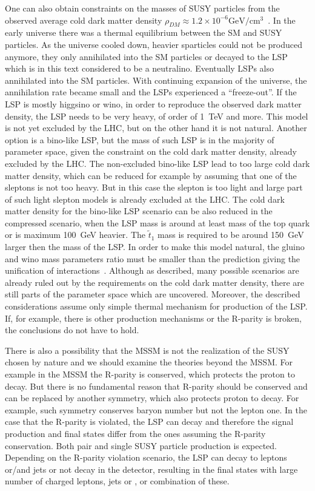 One can also obtain constraints on the masses of SUSY particles from the observed average cold dark matter density $\rho_{DM} \approx 1.2 \times 10^{-6} \mathrm{GeV/cm^{3}}$~\cite{Ade:2015xua, Patrignani:2016xqp}.  In the early universe there was a thermal equilibrium between the SM and SUSY particles. As the universe cooled down, heavier sparticles could not be produced anymore, they only annihilated into the SM particles or decayed to the LSP which is in this text considered to be a neutralino. Eventually LSPs also annihilated into the SM particles. With continuing expansion of the universe, the annihilation rate became small and the LSPs experienced a ``freeze-out''. If the LSP is mostly higgsino or wino, in order to reproduce the observed dark matter density, the LSP needs to be very heavy, of order of 1~TeV and more. This model is not yet excluded by the LHC, but on the other hand it is not natural. Another option is a bino-like LSP, but the mass of such LSP is in the majority of parameter space, given the constraint on the cold dark matter density,  already excluded by the LHC. The non-excluded bino-like LSP lead to too large cold dark matter density, which can be reduced for example by assuming that one of the sleptons is not too heavy.  But in this case the slepton is too light and large part of such light slepton models is already excluded at the LHC. The cold dark matter density for the bino-like LSP scenario can be also reduced in the compressed scenario, when the LSP mass is around at least mass of the top quark or is maximum 100~GeV heavier. The $\tilde{t}_{1}$ mass is required to be around 150~GeV larger then the mass of the LSP. In order to make this  model natural, the gluino and wino mass parameters ratio must be smaller than the prediction giving the unification of interactions~\cite{Martin:2008aw}. Although as described, many possible scenarios are already ruled out by the requirements on the cold dark matter density, there are still parts of the parameter space which are uncovered. Moreover, the described considerations assume only simple thermal mechanism for production of the LSP. If, for example, there is other production mechanisms or the R-parity is broken, the conclusions do not have to hold.

There is also a possibility that the MSSM is not the realization of the SUSY chosen by nature and we should examine the theories beyond the MSSM. For example in the MSSM the R-parity is conserved, which protects the proton to decay. But there is no fundamental reason that R-parity should be conserved and can be replaced by another symmetry, which also protects proton to decay. For example, such symmetry conserves baryon number but not the lepton one. In the case that the R-parity is violated, the LSP can decay and therefore the signal production and final states differ from the ones assuming the R-parity conservation. Both pair and single SUSY particle production is expected. Depending on the R-parity violation scenario, the LSP can decay to leptons or/and jets or not decay in the detector, resulting in the final states with large number of charged leptons, jets or \MET, or combination of these.


